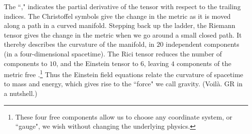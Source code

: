 The ``," indicates the partial derivative of the tensor with respect to the trailing indices. The Christoffel symbols give the change in the metric as it is moved along a path in a curved manifold. Stepping back up the ladder, the Riemann tensor gives the change in the metric when we go around a small closed path. It thereby describes the curvature of the manifold, in $20$ independent components (in a four-dimensional spacetime). The Rici tensor reduces the number of components to $10$, and the Einstein tensor to $6$, leaving $4$ components of the metric free \cite{ref:BlanfordThorne}.\footnote{These four free components allow us to choose any coordinate system, or ``gauge", we wish without changing the underlying physics.} Thus the Einstein field equations relate the curvature of spacetime to mass and energy, which gives rise to the ``force" we call gravity. (Voil\`{a}. \ac{GR} in a nutshell.)

